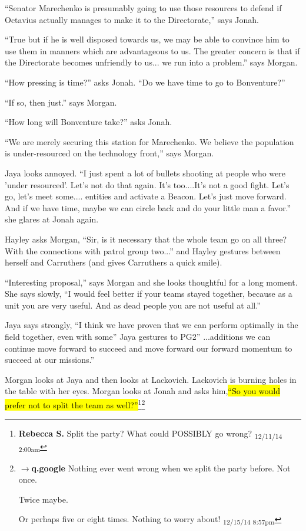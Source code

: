 ``Senator Marechenko is presumably going to use those resources to defend if Octavius actually manages to make it to the Directorate,'' says Jonah.

``True but if he is well disposed towards us, we may be able to convince him to use them in manners which are advantageous to us.  The greater concern is that if the Directorate becomes unfriendly to us... we run into a problem.'' says Morgan.

``How pressing is time?'' asks Jonah. ``Do we have time to go to Bonventure?''

``If so, then just.'' says Morgan.

``How long will Bonventure take?'' asks Jonah.

``We are merely securing this station for Marechenko.  We believe the population is under-resourced on the technology front,'' says Morgan.

Jaya looks annoyed.  ``I just spent a lot of bullets shooting at people who were 'under resourced'.  Let's not do that again.  It's too....It's not a good fight.  Let's go,  let's meet some.... entities and activate a Beacon.  Let's just move forward.  And if we have time, maybe we can circle back and do your little man a favor.'' she glares at Jonah again.

Hayley asks Morgan, ``Sir, is it necessary that the whole team go on all three?  With the connections with patrol group two...'' and Hayley gestures between herself and Carruthers (and gives Carruthers a quick smile).

``Interesting proposal,'' says Morgan and she looks thoughtful for a long moment.  She says slowly, ``I would feel better if your teams stayed together, because as a unit you are very useful.  And as dead people you are not useful at all.''

Jaya says strongly, ``I think we have proven that we can perform optimally in the field together, even with some'' Jaya gestures to PG2'' ...additions we can continue move forward to succeed and move forward our forward momentum to succeed at our missions.''

Morgan looks at Jaya and then looks at Lackovich. Lackovich is burning holes in the table with her eyes.   Morgan looks at Jonah and asks him,\hl{``So you would prefer not to split the team as well?''}\footnote{\textbf{Rebecca S. }Split the party? What could POSSIBLY go wrong? \textsubscript{12/11/14 2:00am}}\footnote{$\rightarrow$\textbf{q.google }Nothing ever went wrong when we split the party before.  Not once.

Twice maybe.

Or perhaps five or eight times.  Nothing to worry about! \textsubscript{12/15/14 8:57pm}}

